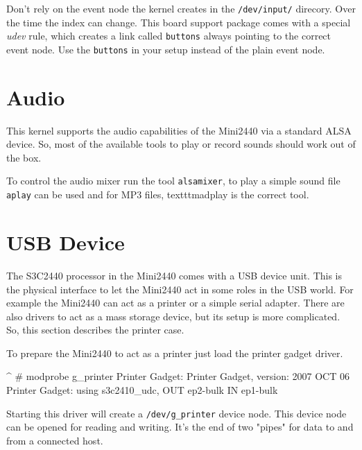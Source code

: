 \begin{important}
Don't rely on the event node the kernel creates in the \texttt{/dev/input/}
direcory. Over the time the index can change. This board support package comes
with a special \textit{udev} rule, which creates a link called \texttt{buttons}
always pointing to the correct event node. Use the \texttt{buttons} in your
setup instead of the plain event node.
\end{important}


\section{Audio}						\label{sec:AUDIO}

This kernel supports the audio capabilities of the Mini2440 via a standard
ALSA device. So, most of the available tools to play or record sounds should
work out of the box.

To control the audio mixer run the tool \texttt{alsamixer}, to play a simple
sound file \texttt{aplay} can be used and for MP3 files, texttt{madplay} is the
correct tool.


\section{USB Device}					\label{sec:USBgadget}

The S3C2440 processor in the Mini2440 comes with a USB device unit. This is
the physical interface to let the Mini2440 act in some roles in the USB world.
For example the Mini2440 can act as a printer or a simple serial adapter.
There are also drivers to act as a mass storage device, but its setup is more
complicated. So, this section describes the printer case.

To prepare the Mini2440 to act as a printer just load the printer gadget driver.

\begin{ptxshell}[escapechar=|]{^}
# modprobe g_printer
Printer Gadget: Printer Gadget, version: 2007 OCT 06
Printer Gadget: using s3c2410_udc, OUT ep2-bulk IN ep1-bulk
\end{ptxshell}

Starting this driver will create a \texttt{/dev/g\_printer} device node. This
device node can be opened for reading and writing. It's the end of two
"pipes" for data to and from a connected host.

